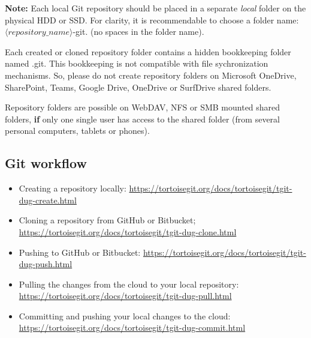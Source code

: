 \textbf{Note:} Each local Git repository should be placed in a separate \emph{local} folder on the physical HDD or SSD. For clarity, it is recommendable to choose a folder name: $\langle repository\_name \rangle$-git. (no spaces in the folder name). 

Each created or cloned repository folder contains a hidden bookkeeping folder named \textsf{.git}. This bookkeeping is not compatible with file sychronization mechanisms. So, please do not create repository folders on Microsoft OneDrive, SharePoint, Teams, Google Drive, OneDrive or SurfDrive shared folders. 

Repository folders are possible on WebDAV, NFS or SMB mounted shared folders, \textbf{if} only one single user has access to the shared folder (from several personal computers, tablets or phones).

\subsection{Git workflow}
\label{appendix:workflow}

\begin{itemize}

\item Creating a repository locally: \url{https://tortoisegit.org/docs/tortoisegit/tgit-dug-create.html}

\item Cloning a repository from GitHub or Bitbucket; \url{https://tortoisegit.org/docs/tortoisegit/tgit-dug-clone.html}

\item Pushing to GitHub or Bitbucket: \url{https://tortoisegit.org/docs/tortoisegit/tgit-dug-push.html}

\item Pulling the changes from the cloud to your local repository: \url{https://tortoisegit.org/docs/tortoisegit/tgit-dug-pull.html}

\item Committing and pushing your local changes to the cloud: \url{https://tortoisegit.org/docs/tortoisegit/tgit-dug-commit.html}
\end{itemize}

\newpage

